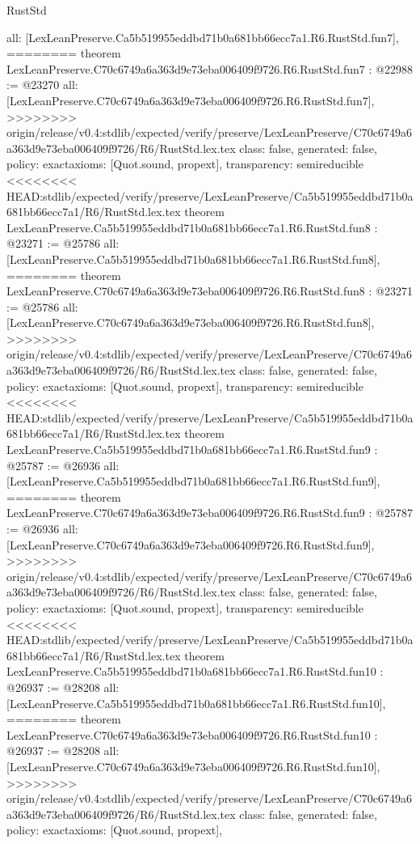 \begin{lexlean}{RustStd}
\begin{coremodule}
{\begin{coremodule}
{{{{{{{{{{  all: [LexLeanPreserve.Ca5b519955eddbd71b0a681bb66ecc7a1.R6.RustStd.fun7],
========
theorem LexLeanPreserve.C70c6749a6a363d9e73eba006409f9726.R6.RustStd.fun7 : @22988 := @23270 {
  all: [LexLeanPreserve.C70c6749a6a363d9e73eba006409f9726.R6.RustStd.fun7],
>>>>>>>> origin/release/v0.4:stdlib/expected/verify/preserve/LexLeanPreserve/C70c6749a6a363d9e73eba006409f9726/R6/RustStd.lex.tex
  class: false,
  generated: false,
  policy: exact{axioms: [Quot.sound, propext]},
  transparency: semireducible
}
<<<<<<<< HEAD:stdlib/expected/verify/preserve/LexLeanPreserve/Ca5b519955eddbd71b0a681bb66ecc7a1/R6/RustStd.lex.tex
theorem LexLeanPreserve.Ca5b519955eddbd71b0a681bb66ecc7a1.R6.RustStd.fun8 : @23271 := @25786 {
  all: [LexLeanPreserve.Ca5b519955eddbd71b0a681bb66ecc7a1.R6.RustStd.fun8],
========
theorem LexLeanPreserve.C70c6749a6a363d9e73eba006409f9726.R6.RustStd.fun8 : @23271 := @25786 {
  all: [LexLeanPreserve.C70c6749a6a363d9e73eba006409f9726.R6.RustStd.fun8],
>>>>>>>> origin/release/v0.4:stdlib/expected/verify/preserve/LexLeanPreserve/C70c6749a6a363d9e73eba006409f9726/R6/RustStd.lex.tex
  class: false,
  generated: false,
  policy: exact{axioms: [Quot.sound, propext]},
  transparency: semireducible
}
<<<<<<<< HEAD:stdlib/expected/verify/preserve/LexLeanPreserve/Ca5b519955eddbd71b0a681bb66ecc7a1/R6/RustStd.lex.tex
theorem LexLeanPreserve.Ca5b519955eddbd71b0a681bb66ecc7a1.R6.RustStd.fun9 : @25787 := @26936 {
  all: [LexLeanPreserve.Ca5b519955eddbd71b0a681bb66ecc7a1.R6.RustStd.fun9],
========
theorem LexLeanPreserve.C70c6749a6a363d9e73eba006409f9726.R6.RustStd.fun9 : @25787 := @26936 {
  all: [LexLeanPreserve.C70c6749a6a363d9e73eba006409f9726.R6.RustStd.fun9],
>>>>>>>> origin/release/v0.4:stdlib/expected/verify/preserve/LexLeanPreserve/C70c6749a6a363d9e73eba006409f9726/R6/RustStd.lex.tex
  class: false,
  generated: false,
  policy: exact{axioms: [Quot.sound, propext]},
  transparency: semireducible
}
<<<<<<<< HEAD:stdlib/expected/verify/preserve/LexLeanPreserve/Ca5b519955eddbd71b0a681bb66ecc7a1/R6/RustStd.lex.tex
theorem LexLeanPreserve.Ca5b519955eddbd71b0a681bb66ecc7a1.R6.RustStd.fun10 : @26937 := @28208 {
  all: [LexLeanPreserve.Ca5b519955eddbd71b0a681bb66ecc7a1.R6.RustStd.fun10],
========
theorem LexLeanPreserve.C70c6749a6a363d9e73eba006409f9726.R6.RustStd.fun10 : @26937 := @28208 {
  all: [LexLeanPreserve.C70c6749a6a363d9e73eba006409f9726.R6.RustStd.fun10],
>>>>>>>> origin/release/v0.4:stdlib/expected/verify/preserve/LexLeanPreserve/C70c6749a6a363d9e73eba006409f9726/R6/RustStd.lex.tex
  class: false,
  generated: false,
  policy: exact{axioms: [Quot.sound, propext]},
}}}}}}}}}}}}}}
\end{coremodule}}
\end{coremodule}
\end{lexlean}
